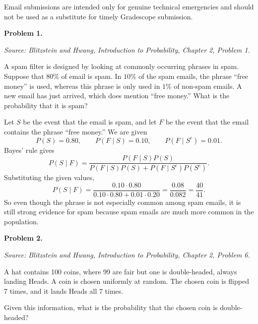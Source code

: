 \documentclass[11pt]{article}
\newcommand{\source}[1]{%
    \vspace{0.15cm}
    {\small\textit{Source: Blitzstein and Hwang, \textit{Introduction to Probability}, Chapter 2, Problem #1.}}
}
\begin{document}
Email submissions are intended only for genuine technical emergencies and should not be used as a substitute for timely Gradescope submission.

\newpage


\begin{problemheader}
\textbf{Problem 1.}
\end{problemheader}
\source{1}

A spam filter is designed by looking at commonly occurring phrases in spam. Suppose that $80\%$ of email is spam. In $10\%$ of the spam emails, the phrase ``free money'' is used, whereas this phrase is only used in $1\%$ of non-spam emails. A new email has just arrived, which does mention ``free money.'' What is the probability that it is spam?

\begin{solutionbox}
Let $S$ be the event that the email is spam, and let $F$ be the event that the email contains the phrase ``free money.'' We are given
\[
P(S)=0.80,\qquad P(F\mid S)=0.10,\qquad P(F\mid S^c)=0.01.
\]
Bayes' rule gives
\[
P(S\mid F)
=
\frac{P(F\mid S)P(S)}{P(F\mid S)P(S)+P(F\mid S^c)P(S^c)}.
\]
Substituting the given values,
\[
P(S\mid F)
=
\frac{0.10\cdot 0.80}{0.10\cdot 0.80+0.01\cdot 0.20}
=
\frac{0.08}{0.082}
=
\frac{40}{41}.
\]
So even though the phrase is not especially common among spam emails, it is still strong evidence for spam because spam emails are much more common in the population.


\end{solutionbox}
\newpage


\begin{problemheader}
\textbf{Problem 2.}
\end{problemheader}
\source{6}

A hat contains 100 coins, where 99 are fair but one is double-headed, always landing Heads. A coin is chosen uniformly at random. The chosen coin is flipped 7 times, and it lands Heads all 7 times.

Given this information, what is the probability that the chosen coin is double-headed?
\end{document}
